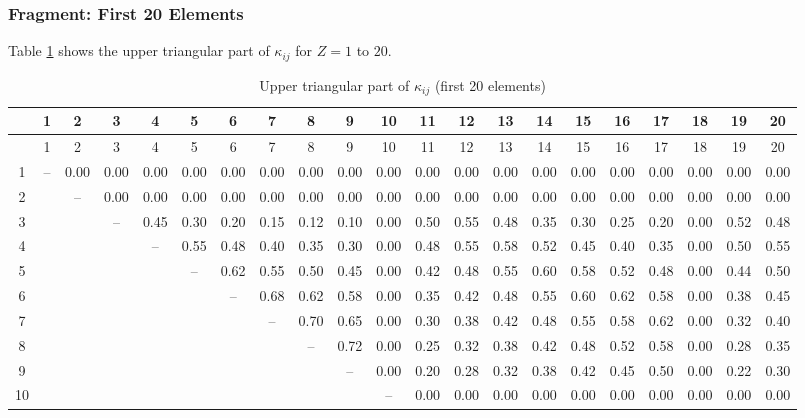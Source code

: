 \documentclass[12pt,a4paper]{article}
\begin{document}
	\subsubsection*{Fragment: First 20 Elements}
	Table \ref{tab:kappa-full-20} shows the upper triangular part of \(\kappa_{ij}\) for \(Z=1\) to \(20\).
	{\tiny
		\begin{longtable}{c|*{20}{c}}
			
			\caption{Upper triangular part of \(\kappa_{ij}\) (first 20 elements)} \label{tab:kappa-full-20} \\
			\toprule
			& 1 & 2 & 3 & 4 & 5 & 6 & 7 & 8 & 9 & 10 & 11 & 12 & 13 & 14 & 15 & 16 & 17 & 18 & 19 & 20 \\
			\midrule
			\endfirsthead
			\toprule
			& 1 & 2 & 3 & 4 & 5 & 6 & 7 & 8 & 9 & 10 & 11 & 12 & 13 & 14 & 15 & 16 & 17 & 18 & 19 & 20 \\
			\midrule
			\endhead
			1  & – & 0.00 & 0.00 & 0.00 & 0.00 & 0.00 & 0.00 & 0.00 & 0.00 & 0.00 & 0.00 & 0.00 & 0.00 & 0.00 & 0.00 & 0.00 & 0.00 & 0.00 & 0.00 & 0.00 \\
			2  &   & – & 0.00 & 0.00 & 0.00 & 0.00 & 0.00 & 0.00 & 0.00 & 0.00 & 0.00 & 0.00 & 0.00 & 0.00 & 0.00 & 0.00 & 0.00 & 0.00 & 0.00 & 0.00 \\
			3  &   &   & – & 0.45 & 0.30 & 0.20 & 0.15 & 0.12 & 0.10 & 0.00 & 0.50 & 0.55 & 0.48 & 0.35 & 0.30 & 0.25 & 0.20 & 0.00 & 0.52 & 0.48 \\
			4  &   &   &   & – & 0.55 & 0.48 & 0.40 & 0.35 & 0.30 & 0.00 & 0.48 & 0.55 & 0.58 & 0.52 & 0.45 & 0.40 & 0.35 & 0.00 & 0.50 & 0.55 \\
			5  &   &   &   &   & – & 0.62 & 0.55 & 0.50 & 0.45 & 0.00 & 0.42 & 0.48 & 0.55 & 0.60 & 0.58 & 0.52 & 0.48 & 0.00 & 0.44 & 0.50 \\
			6  &   &   &   &   &   & – & 0.68 & 0.62 & 0.58 & 0.00 & 0.35 & 0.42 & 0.48 & 0.55 & 0.60 & 0.62 & 0.58 & 0.00 & 0.38 & 0.45 \\
			7  &   &   &   &   &   &   & – & 0.70 & 0.65 & 0.00 & 0.30 & 0.38 & 0.42 & 0.48 & 0.55 & 0.58 & 0.62 & 0.00 & 0.32 & 0.40 \\
			8  &   &   &   &   &   &   &   & – & 0.72 & 0.00 & 0.25 & 0.32 & 0.38 & 0.42 & 0.48 & 0.52 & 0.58 & 0.00 & 0.28 & 0.35 \\
			9  &   &   &   &   &   &   &   &   & – & 0.00 & 0.20 & 0.28 & 0.32 & 0.38 & 0.42 & 0.45 & 0.50 & 0.00 & 0.22 & 0.30 \\
			10 &   &   &   &   &   &   &   &   &   & – & 0.00 & 0.00 & 0.00 & 0.00 & 0.00 & 0.00 & 0.00 & 0.00 & 0.00 & 0.00 \\

\end{longtable}}
\end{document}
